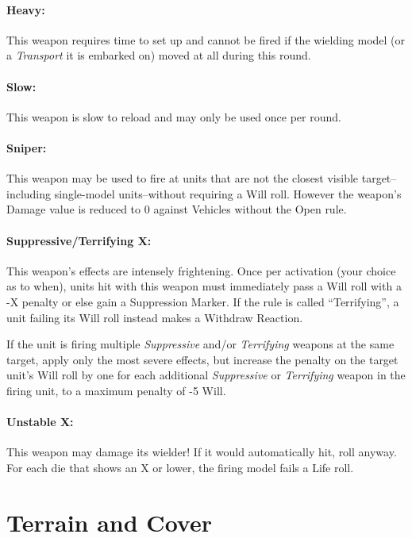 \begin{multicols}{2}
\subsubsection*{Heavy:} This weapon requires time to set up and cannot be fired if the wielding model (or a \textit{Transport} it is embarked on) moved at all during this round.

\subsubsection*{Slow:} This weapon is slow to reload and may only be used once per round.

\subsubsection*{Sniper:} This weapon may be used to fire at units that are not the closest visible target--including single-model units--without requiring a Will roll. However the weapon's Damage value is reduced to 0 against Vehicles without the Open rule.

\subsubsection*{Suppressive/Terrifying X:} This weapon's effects are intensely frightening. Once per activation (your choice as to when), units hit with this weapon must immediately pass a Will roll with a -X penalty or else gain a Suppression Marker. If the rule is called ``Terrifying'', a unit failing its Will roll instead makes a Withdraw Reaction.

If the unit is firing multiple \textit{Suppressive} and/or \textit{Terrifying} weapons at the same target, apply only the most severe effects, but increase the penalty on the target unit's Will roll by one for each additional \textit{Suppressive} or \textit{Terrifying} weapon in the firing unit, to a maximum penalty of -5 Will.

\subsubsection*{Unstable X:} This weapon may damage its wielder! If it would automatically hit, roll anyway. For each die that shows an X or lower, the firing model fails a Life roll.




\chapter*{Terrain and Cover}


\end{multicols}
